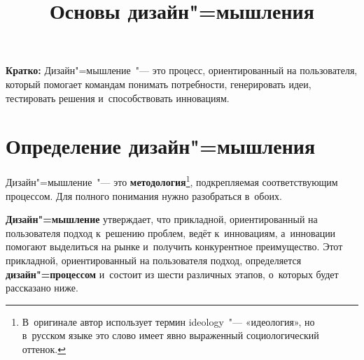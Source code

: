 \documentclass[12pt]{article}
\begin{document}
\title{Основы дизайн"=мышления}


\vspace{0.8em}

\begin{leftbar}
	\large
		\textbf{Кратко:} Дизайн"=мышление~"--- это процесс, ориентированный на пользователя, который помогает командам понимать потребности, генерировать идеи, тестировать решения и~способствовать инновациям.
\end{leftbar}

\vspace{0.8em}
{}
\vspace{-0.8em}
	\begin{leftbar}
		\vspace{-12pt}
		\tableofcontents
	\end{leftbar}

\section{Определение дизайн"=мышления}
Дизайн"=мышление~"--- это \textbf{методология}\footnote{В~оригинале автор использует термин ideology~"--- «идеология», но в~русском языке это слово имеет явно выраженный социологический оттенок.}, подкрепляемая соответствующим процессом. Для полного понимания нужно разобраться в~обоих. 

\begin{leftbar} 
	\textbf{Дизайн"=мышление} утверждает, что прикладной, ориентированный на пользователя подход к~решению проблем, ведёт к~инновациям, а~инновации помогают выделиться на рынке и~получить конкурентное преимущество. Этот прикладной, ориентированный на пользователя подход, определяется \textbf{дизайн"=процессом} и~состоит из шести различных этапов, о~которых будет рассказано ниже.
\end{leftbar}
\end{document}

